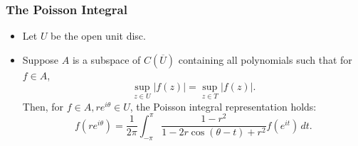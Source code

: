 \documentclass{article}
\newcounter{topicnumber}[section]
\newcommand{\steptopic}[1][1]{\addtocounter{topicnumber}{#1}}
\newenvironment{topic}[1]{%
\steptopic%
\subsubsection{#1}%
\begin{itemize}%
}{%
\end{itemize}%
}
\newcommand{\setup}{\item[\null]}
\newcommand{\remark}{\item}
\begin{document}
\begin{topic}{The Poisson Integral}
\setup Let $U$ be the open unit disc.
\remark Suppose $A$ is a subspace of $C(\overline{U})$ containing all polynomials such that for $f \in A$, $$\sup_{z \in U} |f(z)| = \sup_{z \in T} |f(z)|.$$ Then, for $f \in A, re^{i\theta} \in U$, the Poisson integral representation holds: $$f(re^{i\theta}) = \dfrac{1}{2\pi} \int_{-\pi}^\pi \dfrac{1 - r^2}{1 - 2r \cos (\theta - t) + r^2} f(e^{it})\,dt.$$
\end{topic}

\clearpage
{}
\printindex
\end{document}
